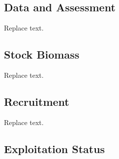 \documentclass[11pt,
  english,
  a4paper,
]{article}
\begin{document}
\hypertarget{data-and-assessment}{%
\subsection*{Data and Assessment}\label{data-and-assessment}}

\leavevmode\tagmcend\tagstructend


Replace text.

\leavevmode\tagmcend\tagstructend\par


\hypertarget{stock-biomass}{%
\subsection*{Stock Biomass}\label{stock-biomass}}

\leavevmode\tagmcend\tagstructend


Replace text.

\leavevmode\tagmcend\tagstructend\par


\hypertarget{recruitment}{%
\subsection*{Recruitment}\label{recruitment}}

\leavevmode\tagmcend\tagstructend


Replace text.

\leavevmode\tagmcend\tagstructend\par


\hypertarget{exploitation-status}{%
\subsection*{Exploitation Status}\label{exploitation-status}}
\end{document}
